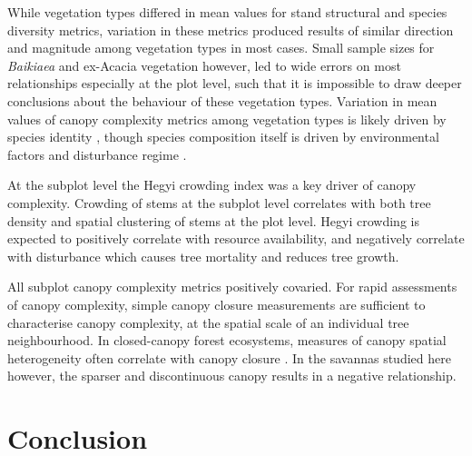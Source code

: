 \documentclass[11pt,a4paper]{article}
\begin{document}
While vegetation types differed in mean values for stand structural and species diversity metrics, variation in these metrics produced results of similar direction and magnitude among vegetation types in most cases. Small sample sizes for \textit{Baikiaea} and ex-Acacia vegetation however, led to wide errors on most relationships especially at the plot level, such that it is impossible to draw deeper conclusions about the behaviour of these vegetation types. Variation in mean values of canopy complexity metrics among vegetation types is likely driven by species identity \citep{}, though species composition itself is driven by environmental factors and disturbance regime \citep{}. 

At the subplot level the Hegyi crowding index was a key driver of canopy complexity. Crowding of stems at the subplot level correlates with both tree density and spatial clustering of stems at the plot level. Hegyi crowding is expected to positively correlate with resource availability, and negatively correlate with disturbance which causes tree mortality and reduces tree growth. 

All subplot canopy complexity metrics positively covaried. For rapid assessments of canopy complexity, simple canopy closure measurements are sufficient to characterise canopy complexity, at the spatial scale of an individual tree neighbourhood. In closed-canopy forest ecosystems, measures of canopy spatial heterogeneity often correlate with canopy closure \citep{}. In the savannas studied here however, the sparser and discontinuous canopy results in a negative relationship. 

\section{Conclusion}

\printbibliography

\end{document}
